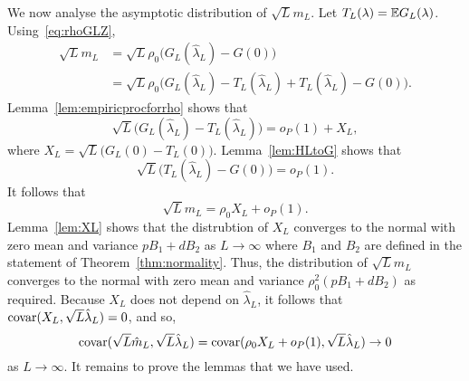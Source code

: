 \documentclass[journal]{IEEEtran}
\begin{document}
We now analyse the asymptotic distribution of $\sqrt{L} m_L$.  Let $T_L(\lambda) = {\mathbb E} G_L(\lambda)$.  Using~\eqref{eq:rhoGLZ},
\begin{align*}
\sqrt{L} m_L &= \sqrt{L} \rho_0 \big( G_L(\hat{\lambda}_L) - G(0) \big) \\
&= \sqrt{L} \rho_0 \big( G_L(\hat{\lambda}_L) - T_L(\hat{\lambda}_L) + T_L(\hat{\lambda}_L) - G(0) \big).
\end{align*}
Lemma~\ref{lem:empiricprocforrho} shows that 
\[
\sqrt{L}\big( G_L(\hat{\lambda}_L) - T_L(\hat{\lambda}_L)  \big) = o_P(1) + X_L,
\]
where $X_L = \sqrt{L}\big( G_L(0) - T_L(0)  \big)$.  Lemma~\ref{lem:HLtoG} shows that
\[
\sqrt{L}\big( T_L(\hat{\lambda}_L) - G(0) \big) = o_P(1).
\]
It follows that
\[
\sqrt{L} m_L =  \rho_0 X_L + o_P(1). 
\]
Lemma~\ref{lem:XL} shows that the distrubtion of $X_L$ converges to the normal with zero mean and variance $p B_1 + d B_2$ as $L\rightarrow\infty$ where $B_1$ and $B_2$ are defined in the statement of Theorem~\ref{thm:normality}.  Thus, the distribution of $\sqrt{L} m_L$ converges to the normal with zero mean and variance $\rho_0^2(p B_1 + d B_2)$ as required.  Because $X_L$ does not depend on $\hat{\lambda}_L$, it follows that $\operatorname{covar}(X_L, \sqrt{L}\hat{\lambda}_L) = 0$, and so,
\[
\operatorname{covar}(\sqrt{L}\hat{m}_L, \sqrt{L}\hat{\lambda}_L) = \operatorname{covar}(\rho_0 X_L + o_P(1), \sqrt{L}\hat{\lambda}_L) \rightarrow 0
\]
as $L \rightarrow \infty$.  It remains to prove the lemmas that we have used.
\end{document}
